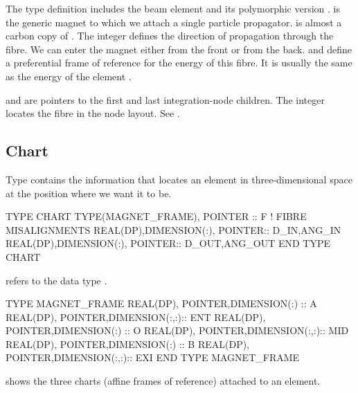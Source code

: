The type definition includes the beam element  and its polymorphic version
.  is the generic magnet to which we attach a single particle
propagator.  is almost a carbon copy of . The integer
 defines the direction of propagation through the fibre. We can
enter the magnet either from the front or from the back.  and
 define a preferential frame of reference for the energy of this fibre.
It is usually the same as the energy of the element .


 and  are pointers to the first and last integration-node children.
The integer  locates the fibre in the node layout. See
.


\subsection{Chart}

Type  contains the information that locates an element in
three-dimensional space at the position where we want it to be.

\begin{ptccode}
TYPE CHART
  TYPE(MAGNET_FRAME), POINTER :: F
  !  FIBRE MISALIGNMENTS
  REAL(DP),DIMENSION(:),  POINTER::   D_IN,ANG_IN
  REAL(DP),DIMENSION(:),  POINTER::   D_OUT,ANG_OUT
END TYPE CHART
\end{ptccode}

 refers to the data type .

\begin{ptccode}
TYPE MAGNET_FRAME
  REAL(DP), POINTER,DIMENSION(:)  ::   A
  REAL(DP), POINTER,DIMENSION(:,:)::   ENT
  REAL(DP), POINTER,DIMENSION(:)  ::   O
  REAL(DP), POINTER,DIMENSION(:,:)::   MID
  REAL(DP), POINTER,DIMENSION(:)  ::   B
  REAL(DP), POINTER,DIMENSION(:,:)::   EXI
END TYPE MAGNET_FRAME
\end{ptccode}

 shows the three charts (affine frames of
reference) attached to an element.

